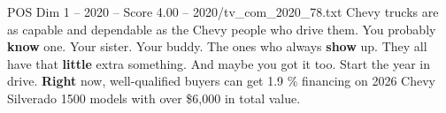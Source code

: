\begin{textsample}{POS Dim 1 – 2020 – Score 4.00 – 2020/tv\_com\_2020\_78.txt}  \label{ex:f1_pos_084}
Chevy trucks are as capable and dependable as the Chevy people who drive them.
You probably \textbf{know} one.
Your sister.
Your buddy.
The ones who always \textbf{show} up.
They all have that \textbf{little} extra something.
And maybe you got it too.
Start the year in drive. \textbf{Right} now, well-qualified buyers can get 1.9 \% financing on 2026 Chevy Silverado 1500 models with over \$6,000 in total value.

\end{textsample}
